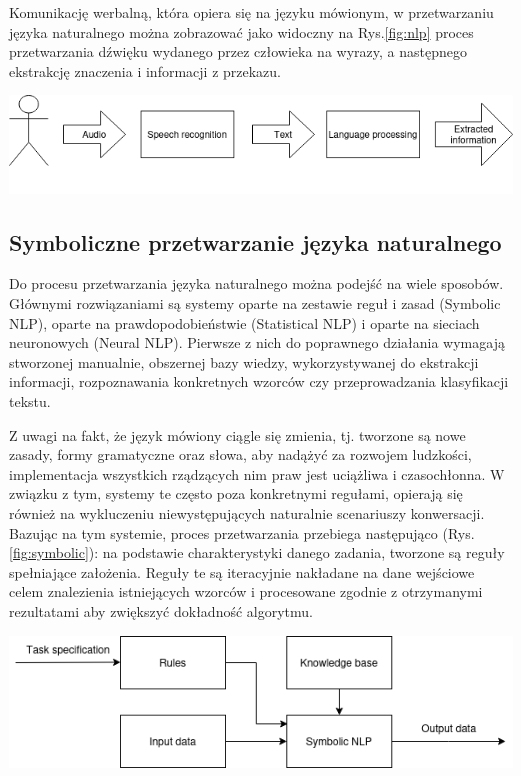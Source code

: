 Komunikację werbalną, która opiera się na języku mówionym, w przetwarzaniu języka naturalnego można zobrazować jako widoczny na Rys.\ref{fig:nlp} proces przetwarzania dźwięku wydanego przez człowieka na wyrazy, a następnego ekstrakcję znaczenia i informacji z przekazu.

\begin{center}
    \includegraphics[width=0.95\linewidth]{files/nlp.png}
    \label{fig:nlp}
\end{center}


\subsection{Symboliczne przetwarzanie języka naturalnego}
\label{subsec:symbolic}

Do procesu przetwarzania języka naturalnego można podejść na wiele sposobów. Głównymi rozwiązaniami są systemy oparte na zestawie reguł i zasad (Symbolic NLP), oparte na prawdopodobieństwie (Statistical NLP) i oparte na sieciach neuronowych (Neural NLP). Pierwsze z nich do poprawnego działania wymagają stworzonej manualnie, obszernej bazy wiedzy, wykorzystywanej do ekstrakcji informacji, rozpoznawania konkretnych wzorców czy przeprowadzania klasyfikacji tekstu. 

Z uwagi na fakt, że język mówiony ciągle się zmienia, tj. tworzone są nowe zasady, formy gramatyczne oraz słowa, aby nadążyć za rozwojem ludzkości, implementacja wszystkich rządzących nim praw jest uciążliwa i czasochłonna. W związku z tym, systemy te często poza konkretnymi regułami, opierają się również na wykluczeniu niewystępujących naturalnie scenariuszy konwersacji. Bazując na tym systemie, proces przetwarzania przebiega następująco (Rys. \ref{fig:symbolic}): na podstawie charakterystyki danego zadania, tworzone są reguły spełniające założenia. Reguły te są iteracyjnie nakładane na dane wejściowe celem znalezienia istniejących wzorców i procesowane zgodnie z otrzymanymi rezultatami aby zwiększyć dokładność algorytmu. 

\begin{center}
    \includegraphics[width=0.95\linewidth]{files/symbolic.png}
    \label{fig:symbolic}
\end{center}

